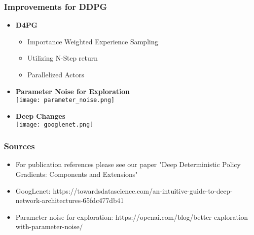 \documentclass[accentcolor=tud1d,colorbacktitle,inverttitle,landscape,german,presentation,t]{tudbeamer}
\begin{document}
	\begin{frame}
		\frametitle{Improvements for DDPG}
		\begin{itemize}
			\item \textbf{D4PG}
			\begin{itemize}
				\item Importance Weighted Experience Sampling
				\item Utilizing N-Step return
				\item Parallelized Actors
			\end{itemize}
		\end{itemize}
		\begin{multicols}{2}
			\begin{itemize}
				\item \textbf{Parameter Noise for Exploration}
				\\
				\hspace*{0.5 cm}\texttt{[image: parameter\_noise.png]}
				\item \textbf{Deep Changes}
				\\
				\vspace*{0.5cm}\texttt{[image: googlenet.png]} 
			\end{itemize}
		\end{multicols}
	\end{frame}
	\begin{frame}
		\frametitle{Sources}
		\begin{itemize}
			\item For publication references please see our paper "Deep Deterministic Policy Gradients: Components and Extensions"
			\item GoogLenet: https://towardsdatascience.com/an-intuitive-guide-to-deep-network-architectures-65fdc477db41
			\item Parameter noise for exploration:
			https://openai.com/blog/better-exploration-with-parameter-noise/			
		\end{itemize}

	\end{frame}
\end{document}
